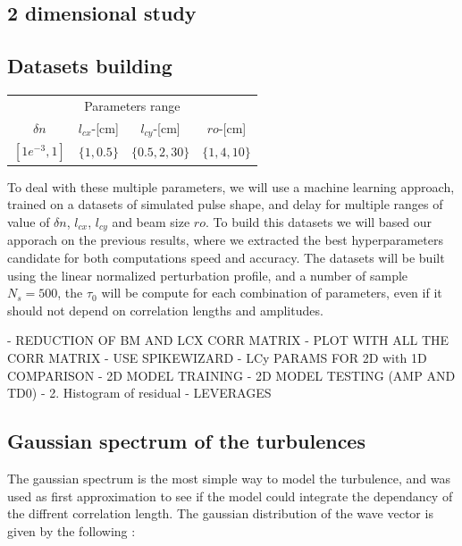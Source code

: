 \documentclass[11pt,a4paper]{report}
\begin{document}
\begin{multicols*}{2}


    \section{2 dimensional study}
    \subsection{Datasets building}
    \begin{center}
        \begin{tabular}{cccc}
            \toprule
            \multicolumn{4}{c}{Parameters range}                            \\
            \cmidrule{1 -4}
            $\delta n$     & $l_{cx}$-[cm] & $l_{cy}$-[cm]   & $ro$-[cm]    \\
            \midrule
            $[1e^{-3}, 1]$ & $\{1, 0.5 \}$ & $\{0.5,2,30 \}$ & $\{1,4,10\}$ \\
            \bottomrule
        \end{tabular}
    \end{center}
    To deal with these multiple parameters, we will use a machine learning approach, trained on a datasets of simulated pulse shape, and delay for multiple ranges of value of $\delta n$, $l_{cx}$, $l_{cy}$ and beam size $ro$.
    To build this datasets we will based our apporach on the previous results, where we extracted the best hyperparameters candidate for both computations speed and accuracy. The datasets will be built using the linear normalized perturbation profile, and a number of sample $N_s = 500$, the $\tau_0$ will be compute for each combination of parameters, even if it should not depend on correlation lengths and amplitudes.

    - REDUCTION OF BM AND LCX CORR MATRIX
    - PLOT WITH ALL THE CORR MATRIX
    - USE SPIKEWIZARD
    - LCy PARAMS FOR 2D with 1D COMPARISON
    - 2D MODEL TRAINING
    - 2D MODEL TESTING (AMP AND TD0)
    - 2. Histogram of residual
    - LEVERAGES
    \subsection{Gaussian spectrum of the turbulences}
    The gaussian spectrum is the most simple way to model the turbulence, and was used as first approximation to see if the model could integrate the dependancy of the diffrent correlation length.
    The gaussian distribution of the wave vector is given by the following :


\end{multicols*}
\end{document}
